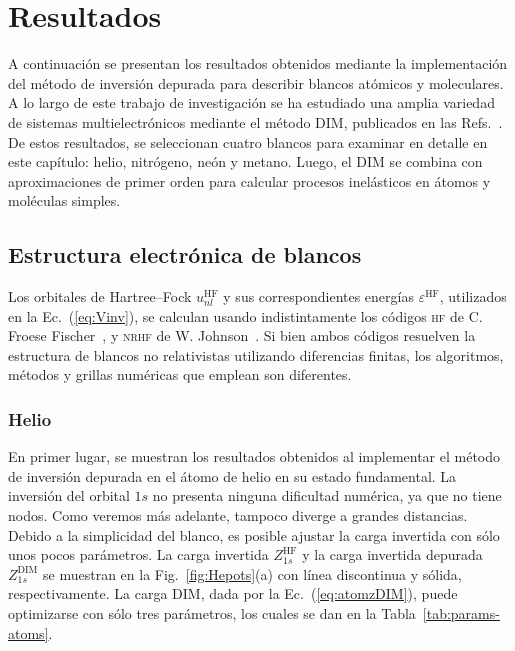 \section{Resultados}
\label{sec:dimresultados}

A continuación se presentan los resultados obtenidos mediante la 
implementación del método de inversión depurada para describir blancos
atómicos y moleculares. A lo largo de este trabajo de investigación se 
ha estudiado una amplia variedad de sistemas multielectrónicos mediante 
el método DIM, publicados en las Refs.~\cite{Mendez:16,Mendez:19dim,
Mendez:18}. De estos resultados, se seleccionan cuatro blancos para 
examinar en detalle en este capítulo: helio, nitrógeno, neón y metano. 
Luego, el DIM se combina con aproximaciones de primer orden para 
calcular procesos inelásticos en átomos y moléculas simples. 

\subsection{Estructura electrónica de blancos}
\label{subsec:dimtarget}

Los orbitales de Hartree--Fock $u_{nl}^{\mathrm{HF}}$ y sus 
correspondientes energías $\varepsilon^{\mathrm{HF}}$, utilizados en la 
Ec.~(\ref{eq:Vinv}), se calculan usando indistintamente los códigos 
\textsc{hf} de C. Froese Fischer~\cite{FroeseFischer:97}, y 
\textsc{nrhf} de W. Johnson~\cite{Johnson:07}. Si bien ambos códigos 
resuelven la estructura de blancos no relativistas utilizando 
diferencias finitas, los algoritmos, métodos y grillas numéricas 
que emplean son diferentes. 

\subsubsection{Helio}

En primer lugar, se muestran los resultados obtenidos al implementar
el método de inversión depurada en el átomo de helio en su estado
fundamental. La inversión del orbital $1s$ no presenta ninguna 
dificultad numérica, ya que no tiene nodos. Como veremos más adelante, 
tampoco diverge a grandes distancias. Debido a la simplicidad del 
blanco, es posible ajustar la carga invertida con sólo unos pocos 
parámetros. La carga invertida $Z_{1s}^{\mathrm{HF}}$ y la carga 
invertida depurada $Z_{1s}^{\mathrm{DIM}}$ se muestran en la 
Fig.~\ref{fig:Hepots}(a) con línea discontinua y sólida, 
respectivamente. La carga DIM, dada por la Ec.~(\ref{eq:atomzDIM}), 
puede optimizarse con sólo tres parámetros, los cuales se dan en la 
Tabla~\ref{tab:params-atoms}. 

